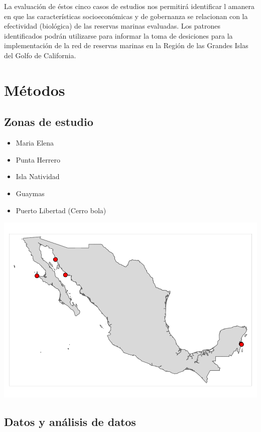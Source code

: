 \documentclass[12pt,]{article}
\providecommand{\tightlist}{%
  \setlength{\itemsep}{0pt}\setlength{\parskip}{0pt}}
\begin{document}
La evaluación de éstos cinco casos de estudios nos permitirá identificar
l amanera en que las características socioeconómicas y de gobernanza se
relacionan con la efectividad (biológica) de las reservas marinas
evaluadas. Los patrones identificados podrán utilizarse para informar la
toma de desiciones para la implementación de la red de reservas marinas
en la Región de las Grandes Islas del Golfo de California.

\section{Métodos}\label{metodos}

\subsection{Zonas de estudio}\label{zonas-de-estudio}

\begin{itemize}
\tightlist
\item
  Maria Elena
\item
  Punta Herrero
\item
  Isla Natividad
\item
  Guaymas
\item
  Puerto Libertad (Cerro bola)
\end{itemize}

\includegraphics{Manuscript_files/figure-latex/unnamed-chunk-2-1.pdf}

\subsection{Datos y análisis de datos}\label{datos-y-analisis-de-datos}
\end{document}
